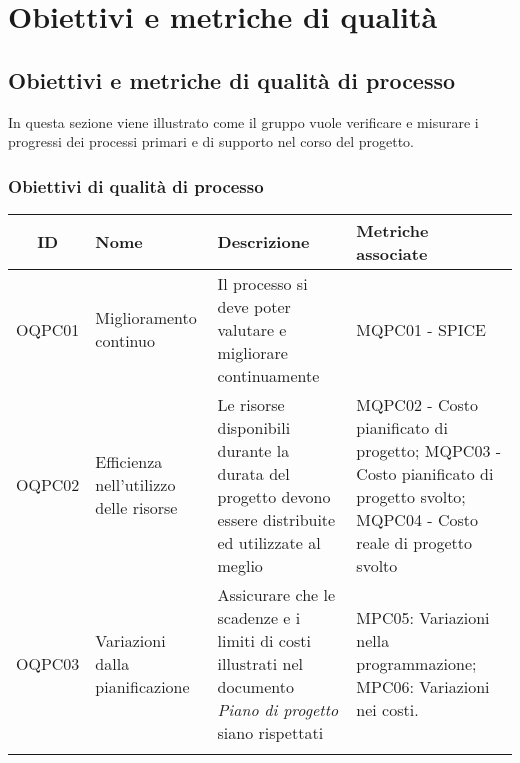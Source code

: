 \section{Obiettivi e metriche di qualità}
\subsection{Obiettivi e metriche di qualità di processo}
In questa sezione viene illustrato come il gruppo vuole verificare e misurare i progressi dei processi primari e di supporto nel corso del progetto. 
\subsubsection{Obiettivi di qualità di processo}
\begin{center}
	\setlength\extrarowheight{5pt}
	\begin{tabularx}{\textwidth}{|c|X|X|X|}
	\hline
	\rowcolor{white}
	\textbf{ID} & \textbf{Nome} & \textbf{Descrizione} & \textbf{Metriche associate}\\
	\hline
	OQPC01 & Miglioramento continuo & Il processo si deve poter valutare e migliorare continuamente & MQPC01 - SPICE\\
	\hline
	OQPC02 & Efficienza nell'utilizzo delle risorse & Le risorse disponibili durante la durata del progetto devono essere distribuite ed utilizzate al meglio & MQPC02 - Costo pianificato di progetto; MQPC03 - Costo pianificato di progetto svolto; \hspace{25pt} MQPC04 - Costo reale di progetto svolto \\
	\hline
	OQPC03 & Variazioni dalla pianificazione & Assicurare che le scadenze e i limiti di costi illustrati nel documento \textit{Piano di progetto} siano rispettati &  MPC05: Variazioni nella programmazione;\hspace{65pt} MPC06: Variazioni nei costi. \\
	\hline
	\rowcolor{white}
	\caption{Obiettivi di qualità di processo.}
	\end{tabularx}
\end{center}

